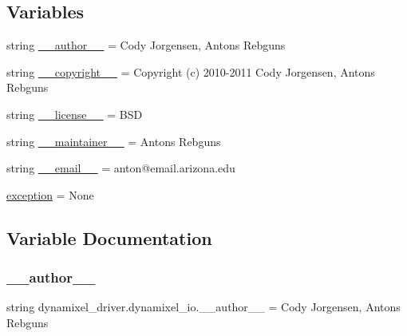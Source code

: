 \subsection*{Variables}
\begin{DoxyCompactItemize}
\item 
string \hyperlink{namespacedynamixel__driver_1_1dynamixel__io_acbf62bf6256929aaf6ec2912dd676390}{\+\_\+\+\_\+author\+\_\+\+\_\+} = \textquotesingle{}Cody Jorgensen, Antons Rebguns\textquotesingle{}
\item 
string \hyperlink{namespacedynamixel__driver_1_1dynamixel__io_a4458d1d2bfdff451a884152e003fc2e2}{\+\_\+\+\_\+copyright\+\_\+\+\_\+} = \textquotesingle{}Copyright (c) 2010-\/2011 Cody Jorgensen, Antons Rebguns\textquotesingle{}
\item 
string \hyperlink{namespacedynamixel__driver_1_1dynamixel__io_a44e502684e2a51b3ea83349e514e1055}{\+\_\+\+\_\+license\+\_\+\+\_\+} = \textquotesingle{}B\+SD\textquotesingle{}
\item 
string \hyperlink{namespacedynamixel__driver_1_1dynamixel__io_ac47fec165e589c4ea678a02bc06b1a92}{\+\_\+\+\_\+maintainer\+\_\+\+\_\+} = \textquotesingle{}Antons Rebguns\textquotesingle{}
\item 
string \hyperlink{namespacedynamixel__driver_1_1dynamixel__io_a404693cb48980f301e6c36e780e8777a}{\+\_\+\+\_\+email\+\_\+\+\_\+} = \textquotesingle{}anton@email.\+arizona.\+edu\textquotesingle{}
\item 
\hyperlink{namespacedynamixel__driver_1_1dynamixel__io_ac0370165eca273bffd194963f2c746f7}{exception} = None
\end{DoxyCompactItemize}


\subsection{Variable Documentation}
\mbox{\label{namespacedynamixel__driver_1_1dynamixel__io_acbf62bf6256929aaf6ec2912dd676390}} 
\subsubsection{\texorpdfstring{\+\_\+\+\_\+author\+\_\+\+\_\+}{\_\_author\_\_}}
{\footnotesize\ttfamily string dynamixel\+\_\+driver.\+dynamixel\+\_\+io.\+\_\+\+\_\+author\+\_\+\+\_\+ = \textquotesingle{}Cody Jorgensen, Antons Rebguns\textquotesingle{}\hspace{0.3cm}{\ttfamily [private]}}




